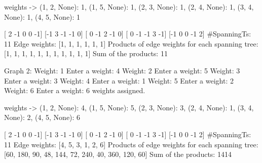 weights -> {(1, 2, None): 1, (1, 5, None): 1, (2, 3, None): 1, (2, 4, None): 1, (3, 4, None): 1, (4, 5, None): 1}

[ 2 -1  0  0 -1]
[-1  3 -1 -1  0]
[ 0 -1  2 -1  0]
[ 0 -1 -1  3 -1]
[-1  0  0 -1  2]
#SpanningTs:  11
Edge weights: [1, 1, 1, 1, 1, 1]
Products of edge weights for each spanning tree: [1, 1, 1, 1, 1, 1, 1, 1, 1, 1, 1]
Sum of the products: 11

Graph 2:
Weight: 1
Enter a weight: 4
Weight: 2
Enter a weight: 5
Weight: 3
Enter a weight: 3
Weight: 4
Enter a weight: 1
Weight: 5
Enter a weight: 2
Weight: 6
Enter a weight: 6
weights assigned.

weights -> {(1, 2, None): 4, (1, 5, None): 5, (2, 3, None): 3, (2, 4, None): 1, (3, 4, None): 2, (4, 5, None): 6}

[ 2 -1  0  0 -1]
[-1  3 -1 -1  0]
[ 0 -1  2 -1  0]
[ 0 -1 -1  3 -1]
[-1  0  0 -1  2]
#SpanningTs:  11
Edge weights: [4, 5, 3, 1, 2, 6]
Products of edge weights for each spanning tree: [60, 180, 90, 48, 144, 72, 240, 40, 360, 120, 60]
Sum of the products: 1414
